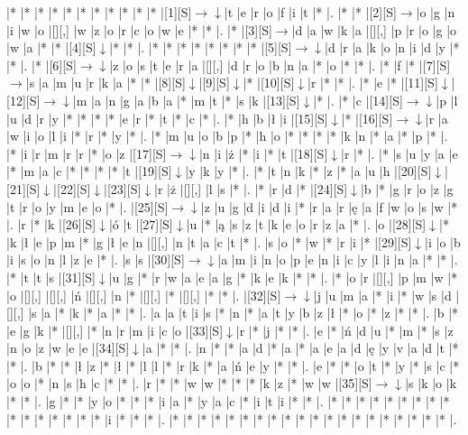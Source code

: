 \documentclass[11pt]{article}
\newcommand\drarr{$\rightarrow \!\!\!\!\! \downarrow$}
\newcommand\rarr{$\rightarrow$}
\newcommand\darr{$\downarrow$}
\begin{document}
\noindent\begin{Puzzle}{19}{31}|*	|*	|*	|*	|*	|*	|*	|*	|*	|*	|*	|[1][S]\drarr	|t	|e	|r	|o	|f	|i	|t	|*	|.
|*	|*	|[2][S]\rarr	|o	|g	|n	|i	|w	|o	|[][,]{ }	|w	|z	|o	|r	|c	|o	|w	|e	|*	|*	|.
|*	|[3][S]\rarr	|d	|a	|w	|k	|a	|[][,]{ }	|p	|r	|o	|g	|o	|w	|a	|*	|*	|[4][S]\darr	|*	|*	|.
|*	|*	|*	|*	|*	|*	|*	|*	|[5][S]\drarr	|d	|r	|a	|k	|o	|n	|i	|d	|y	|*	|*	|.
|*	|[6][S]\drarr	|z	|o	|s	|t	|e	|r	|a	|[][,]{ }	|d	|r	|o	|b	|n	|a	|*	|o	|*	|*	|.
|*	|f	|*	|[7][S]\rarr	|s	|a	|m	|u	|r	|k	|a	|*	|*	|[8][S]\darr	|[9][S]\darr	|*	|[10][S]\darr	|r	|*	|*	|.
|*	|e	|*	|[11][S]\darr	|[12][S]\drarr	|m	|a	|n	|g	|a	|b	|a	|*	|m	|t	|*	|s	|k	|[13][S]\darr	|*	|.
|*	|c	|[14][S]\drarr	|p	|l	|u	|d	|r	|y	|*	|*	|*	|*	|e	|r	|*	|t	|*	|c	|*	|.
|*	|h	|b	|ł	|i	|[15][S]\darr	|*	|[16][S]\drarr	|r	|a	|w	|i	|o	|l	|i	|*	|r	|*	|y	|*	|.
|*	|m	|u	|o	|b	|p	|*	|h	|o	|*	|*	|*	|*	|k	|n	|*	|a	|*	|p	|*	|.
|*	|i	|r	|m	|r	|r	|*	|o	|z	|[17][S]\drarr	|n	|i	|ż	|*	|i	|*	|t	|[18][S]\darr	|r	|*	|.
|*	|s	|u	|y	|a	|e	|*	|m	|a	|c	|*	|*	|*	|*	|t	|[19][S]\darr	|y	|k	|y	|*	|.
|*	|t	|n	|k	|*	|z	|*	|a	|u	|h	|[20][S]\darr	|[21][S]\darr	|[22][S]\darr	|[23][S]\darr	|r	|ż	|[][,]{ }	|l	|s	|*	|.
|*	|r	|d	|*	|[24][S]\darr	|b	|*	|g	|r	|o	|z	|g	|t	|r	|o	|y	|m	|e	|o	|*	|.
|[25][S]\drarr	|z	|u	|g	|d	|i	|d	|i	|*	|r	|a	|r	|ę	|a	|f	|w	|o	|s	|w	|*	|.
|r	|*	|k	|[26][S]\darr	|ó	|t	|[27][S]\darr	|u	|*	|ą	|s	|z	|t	|k	|e	|o	|r	|z	|a	|*	|.
|o	|[28][S]\darr	|*	|k	|ł	|e	|p	|m	|*	|g	|ł	|e	|n	|[][,]{ }	|n	|t	|a	|c	|t	|*	|.
|s	|o	|*	|w	|*	|r	|i	|*	|[29][S]\darr	|i	|o	|b	|i	|s	|o	|n	|l	|z	|e	|*	|.
|s	|s	|[30][S]\drarr	|a	|m	|i	|n	|o	|p	|e	|n	|i	|c	|y	|l	|i	|n	|a	|*	|*	|.
|*	|t	|t	|s	|[31][S]\darr	|u	|g	|*	|r	|w	|a	|e	|a	|g	|*	|k	|e	|k	|*	|*	|.
|*	|o	|r	|[][,]{ }	|p	|m	|w	|*	|o	|[][,]{ }	|[][,]{ }	|ń	|[][,]{ }	|n	|*	|[][,]{ }	|*	|[][,]{ }	|*	|*	|.
|[32][S]\drarr	|j	|u	|m	|a	|*	|i	|*	|w	|s	|d	|[][,]{ }	|s	|a	|*	|k	|*	|a	|*	|*	|.
|a	|a	|t	|i	|s	|*	|n	|*	|a	|t	|y	|b	|z	|ł	|*	|o	|*	|z	|*	|*	|.
|b	|*	|e	|g	|k	|*	|[][,]{ }	|*	|n	|r	|m	|i	|c	|o	|[33][S]\darr	|r	|*	|j	|*	|*	|.
|e	|*	|ń	|d	|u	|*	|m	|*	|s	|z	|n	|o	|z	|w	|e	|e	|[34][S]\darr	|a	|*	|*	|.
|n	|*	|*	|a	|d	|*	|a	|*	|a	|e	|a	|d	|ę	|y	|v	|a	|d	|t	|*	|*	|.
|b	|*	|*	|ł	|z	|*	|ł	|*	|l	|l	|*	|r	|k	|*	|a	|ń	|e	|y	|*	|*	|.
|e	|*	|*	|o	|t	|*	|y	|*	|s	|c	|*	|o	|o	|*	|n	|s	|h	|c	|*	|*	|.
|r	|*	|*	|w	|w	|*	|*	|*	|k	|z	|*	|w	|w	|[35][S]\drarr	|s	|k	|o	|k	|*	|*	|.
|g	|*	|*	|y	|o	|*	|*	|*	|i	|a	|*	|y	|a	|c	|*	|i	|t	|i	|*	|*	|.
|*	|*	|*	|*	|*	|*	|*	|*	|*	|*	|*	|*	|*	|*	|*	|*	|i	|*	|*	|*	|.
|*	|*	|*	|*	|*	|*	|*	|*	|*	|*	|*	|*	|*	|*	|*	|*	|*	|*	|*	|*	|.\end{Puzzle}
\end{document}

